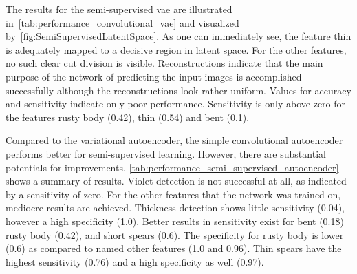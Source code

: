 \begin{table}[!htb]
    \centering
    \caption[Semi-Supervised Convolutional Autoencoder Performance]{\textbf{Convolutional Autoencoder Performance}~~~Performance of the Semi-Supervised Convolutional Autoencoder.}
    \label{tab:performance_semi_supervised_autoencoder}
\end{table}

\bigskip
The results for the semi-supervised \acrshort{vae} are illustrated in~\autoref{tab:performance_convolutional_vae} and visualized by~\autoref{fig:SemiSupervisedLatentSpace}. As one can immediately see, the feature thin is adequately mapped to a decisive region in latent space. For the other features, no such clear cut division is visible. Reconstructions indicate that the main purpose of the network of predicting the input images is accomplished successfully although the reconstructions look rather uniform. Values for accuracy and sensitivity indicate only poor performance. Sensitivity is only above zero for the features rusty body (0.42), thin (0.54) and bent (0.1).

Compared to the variational autoencoder, the simple  convolutional autoencoder performs better for semi-supervised learning. However, there are substantial potentials for improvements. \autoref{tab:performance_semi_supervised_autoencoder} shows a summary of results. Violet detection is not successful at all, as indicated by a sensitivity of zero. For the other features that the network was trained on, mediocre results are achieved. Thickness detection shows little sensitivity (0.04), however a high specificity (1.0). Better results in sensitivity exist for bent (0.18) rusty body (0.42), and short spears (0.6). The specificity for rusty body is lower (0.6) as compared to named other features (1.0 and 0.96). Thin spears have the highest sensitivity (0.76) and a high specificity as well (0.97).

